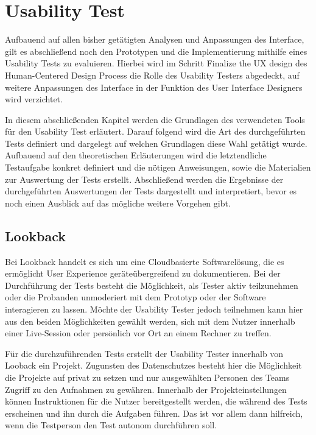 \chapter{Usability Test}\label{ch:outlook}

Aufbauend auf allen bisher getätigten Analysen und Anpassungen des Interface, gilt es abschließend noch den Prototypen und die Implementierung mithilfe eines Usability Tests zu evaluieren.
Hierbei wird im Schritt \glqq Finalize the UX design\grqq{} des Human-Centered Design Process die Rolle des Usability Testers abgedeckt, auf weitere Anpassungen des Interface in der Funktion des User Interface Designers wird verzichtet.

In diesem abschließenden Kapitel werden die Grundlagen des verwendeten Tools für den Usability Test erläutert.
Darauf folgend wird die Art des durchgeführten Tests definiert und dargelegt auf welchen Grundlagen diese Wahl getätigt wurde.
Aufbauend auf den theoretischen Erläuterungen wird die letztendliche Testaufgabe konkret definiert und die nötigen Anweisungen, sowie die Materialien zur Auswertung der Tests erstellt.
Abschließend werden die Ergebnisse der durchgeführten Auswertungen der Tests dargestellt und interpretiert, bevor es noch einen Ausblick auf das mögliche weitere Vorgehen gibt.

\section{Lookback}

Bei Lookback handelt es sich um eine Cloudbasierte Softwarelösung, die es ermöglicht User Experience geräteübergreifend zu dokumentieren.
Bei der Durchführung der Tests besteht die Möglichkeit, als Tester aktiv teilzunehmen oder die Probanden unmoderiert mit dem Prototyp oder der Software interagieren zu lassen.
Möchte der Usability Tester jedoch teilnehmen kann hier aus den beiden Möglichkeiten gewählt werden, sich mit dem Nutzer innerhalb einer Live-Session oder persönlich vor Ort an einem Rechner zu treffen.

Für die durchzuführenden Tests erstellt der Usability Tester innerhalb von Looback ein Projekt.
Zugunsten des Datenschutzes besteht hier die Möglichkeit die Projekte auf privat zu setzen und nur ausgewählten Personen des Teams Zugriff zu den Aufnahmen zu gewähren.
Innerhalb der Projekteinstellungen können Instruktionen für die Nutzer bereitgestellt werden, die während des Tests erscheinen und ihn durch die Aufgaben führen.
Das ist vor allem dann hilfreich, wenn die Testperson den Test autonom durchführen soll.

